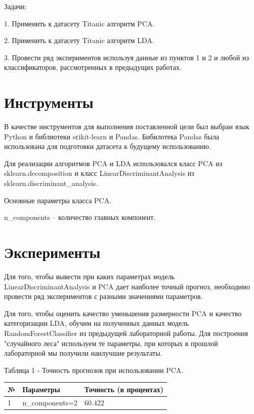 \documentclass[a4paper,12pt]{article}
\begin{document}
	\vspace{0.5cm}
	Задачи: 
	
	\vspace{0.5cm}
	1. Применить к датасету Titanic алгоритм PCA.
	
	\vspace{0.5cm}
	2. Применить к датасету Titanic алгоритм LDA.
	
	\vspace{0.5cm}
	3. Провести ряд экспериментов используя данные из пунктов 1 и 2 и любой из классификаторов, рассмотренных в предыдущих работах.
	
	
\newpage\section{Инструменты} 
	В качестве инструментов для выполнения поставленной цели был выбран язык Python и библиотеки sсikit-learn и Pandas.
	Бибилотека Pandas была использована для подготовки датасета к будущему использованию.
	
	\vspace{0.5cm}
	Для реализации алгоритмов PCA и LDA использовался класс PCA из sklearn.decomposition и класс LinearDiscriminantAnalysis из sklearn.discriminant\_analysis.
	
	\vspace{0.5cm}
	Основные параметры класса PCA.
	
	\vspace{0.5cm}
	n\_components – количество главных компонент.

	
\newpage\section{Эксперименты}
	Для того, чтобы вывести при каких параметрах модель LinearDiscriminantAnalysis и PCA дает наиболее точный прогноз, необходимо провести ряд экспериментов с разными значениями параметров. 
	
	\vspace{0.5cm}
	Для того, чтобы оценить качество уменьшения размерности PCA и качество категоризации LDA,  обучим на полученных данных модель RandomForestClassifier из предыдущей лабораторной работы. Для построения "случайного леса" используем те параметры, при которых в прошлой лабораторной мы получили наилучшие результаты. 
	
	\vspace{0.5cm}
	

	\vspace{0.5cm}
	Таблица 1 - Точность прогнозов  при использовании PCA.
\begin{longtable}{|p{1cm}|p{9cm}|p{3cm}|}
\hline
№ & Параметры & Точность (в процентах) \\ 
\hline 
1 & n\_components=2 & 60.422 \\
\hline
\end{longtable}
\end{document}
